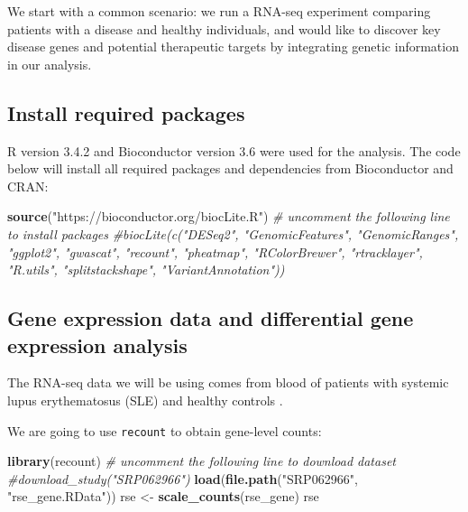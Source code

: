 \documentclass[9pt,a4paper,]{extarticle}
\newenvironment{Shaded}{\begin{snugshade}}{\end{snugshade}}
\newcommand{\KeywordTok}[1]{\textcolor[rgb]{0.13,0.29,0.53}{\textbf{#1}}}
\newcommand{\StringTok}[1]{\textcolor[rgb]{0.31,0.60,0.02}{#1}}
\newcommand{\CommentTok}[1]{\textcolor[rgb]{0.56,0.35,0.01}{\textit{#1}}}
\newcommand{\NormalTok}[1]{#1}
\begin{document}
We start with a common scenario: we run a RNA-seq experiment comparing patients with a disease and healthy individuals, and would like to discover key disease genes and potential therapeutic targets by integrating genetic information in our analysis.

\subsection{Install required packages}\label{install-required-packages}

R version 3.4.2 and Bioconductor version 3.6 were used for the analysis.
The code below will install all required packages and dependencies from Bioconductor and CRAN:

\begin{Shaded}
\begin{Highlighting}[]
\KeywordTok{source}\NormalTok{(}\StringTok{"https://bioconductor.org/biocLite.R"}\NormalTok{)}
\CommentTok{# uncomment the following line to install packages}
\CommentTok{#biocLite(c("DESeq2", "GenomicFeatures", "GenomicRanges", "ggplot2", "gwascat", "recount", "pheatmap", "RColorBrewer", "rtracklayer", "R.utils", "splitstackshape", "VariantAnnotation"))}
\end{Highlighting}
\end{Shaded}

\subsection{Gene expression data and differential gene expression analysis}\label{gene-expression-data-and-differential-gene-expression-analysis}

The RNA-seq data we will be using comes from blood of patients with systemic lupus erythematosus (SLE) and healthy controls \citep{Hung2015}.

We are going to use \texttt{recount} \citep{Collado-Torres2017} to obtain gene-level counts:

\begin{Shaded}
\begin{Highlighting}[]
\KeywordTok{library}\NormalTok{(recount)}
\CommentTok{# uncomment the following line to download dataset}
\CommentTok{#download_study("SRP062966")}
\KeywordTok{load}\NormalTok{(}\KeywordTok{file.path}\NormalTok{(}\StringTok{"SRP062966"}\NormalTok{, }\StringTok{"rse_gene.RData"}\NormalTok{))}
\NormalTok{rse <-}\StringTok{ }\KeywordTok{scale_counts}\NormalTok{(rse_gene)}
\NormalTok{rse}
\end{Highlighting}
\end{Shaded}
\end{document}
